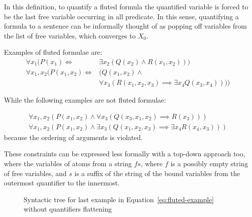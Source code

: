 In this definition, to quantify a fluted formula the quantified variable is forced to be the last free variable occurring in all predicate. In this sense, quantifying a formula to a sentence can be informally thought of as popping off variables from the list of free variables, which converges to \(X_0\).


Examples of fluted formulae are:
\begin{equation}\label{eq:fluted-example}
  \begin{aligned}
    \forall x_1 (P(x_1) \iff &\exists x_2(Q(x_2) \land R(x_1, x_2)))\\
    \forall x_1,x_2 (P(x_1,x_2) \iff &  (Q(x_1,x_2) \land\\
                                     &  \forall x_3 (R(x_1,x_2,x_3) \implies \exists x_4 Q(x_3,x_4))))
  \end{aligned}
\end{equation}

While the following examples are not fluted formulae:

\begin{equation}\label{eq:not-fluted-example}
  \begin{aligned}
    \forall x_1,x_2(P(x_1,x_2) \land \forall x_3(Q(x_3,x_1,x_2) \implies R(x_3)))\\
    \forall x_1,x_2(P(x_1,x_2) \land \exists x_3(Q(x_1,x_2,x_3) \implies \exists x_4 R(x_4,x_3)))
  \end{aligned}
\end{equation}
because the ordering of arguments is violated.

These constraints can be expressed less formally with a top-down approach too, where the variables of atoms from a string \(fs\), where \(f\) is a possibly empty string of free variables, and \(s\) is a suffix of the string of the bound variables from the outermost quantifier to the innermost.

\begin{figure}[H]
    \centering
    \caption{Syntactic tree for last example in Equation~\ref{eq:fluted-example} without quantifiers flattening}\label{fig:fluted_syntree}
\end{figure}

